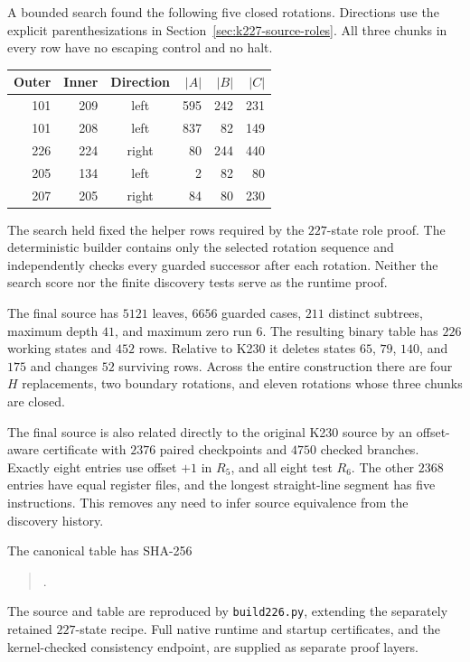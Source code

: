 A bounded search found the following five closed rotations.  Directions
use the explicit parenthesizations in Section~\ref{sec:k227-source-roles}.
All three chunks in every row have no escaping control and no halt.
\begin{center}
\begin{tabular}{r r c r r r}
Outer & Inner & Direction & $|A|$ & $|B|$ & $|C|$\\
\hline
101 & 209 & left  & 595 & 242 & 231\\
101 & 208 & left  & 837 & 82 & 149\\
226 & 224 & right & 80 & 244 & 440\\
205 & 134 & left  & 2 & 82 & 80\\
207 & 205 & right & 84 & 80 & 230
\end{tabular}
\end{center}

The search held fixed the helper rows required by the $227$-state role
proof.  The deterministic builder contains only the selected rotation
sequence and independently checks every guarded successor after each
rotation.  Neither the search score nor the finite discovery tests
serve as the runtime proof.

The final source has $5121$ leaves, $6656$ guarded cases, $211$ distinct
subtrees, maximum depth $41$, and maximum zero run $6$.
The resulting binary table has $226$ working states and $452$ rows.
Relative to K230 it deletes states $65$, $79$, $140$, and $175$ and
changes $52$ surviving rows.  Across the entire construction there are
four $H$ replacements, two boundary rotations, and eleven rotations
whose three chunks are closed.

The final source is also related directly to the original K230 source
by an offset-aware certificate with $2376$ paired checkpoints and
$4750$ checked branches.  Exactly eight entries use offset $+1$ in
$R_5$, and all eight test $R_6$.  The other $2368$ entries have equal
register files, and the longest straight-line segment has five
instructions.  This removes any need to infer source equivalence from
the discovery history.

The canonical table has SHA-256
\begin{quote}\small
{}.
\end{quote}
The source and table are reproduced by \texttt{build226.py}, extending
the separately retained $227$-state recipe.  Full native runtime and
startup certificates, and the kernel-checked consistency endpoint,
are supplied as separate proof layers.

